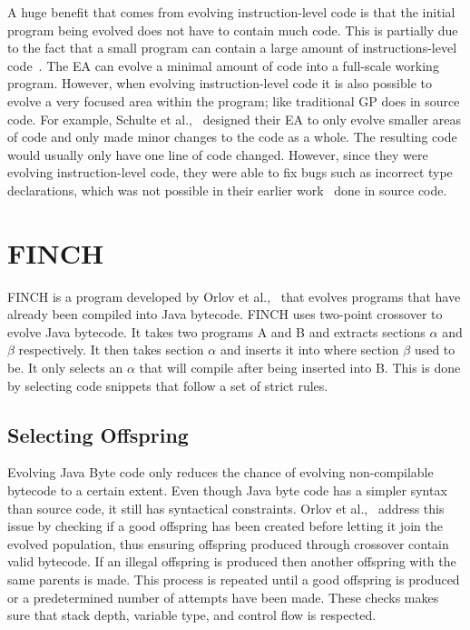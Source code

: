 \documentclass{sig-alternate}
\begin{document}
A huge benefit that comes from evolving instruction-level code is that the initial program being evolved does not have to contain much code. This is partially due to the fact that a small program can contain a large amount of instructions-level code~\cite{Assembly:2010}. The EA can evolve a minimal amount of code into a full-scale working program. However, when evolving instruction-level code it is also possible to evolve a very focused area within the program; like traditional GP does in source code. For example, Schulte et al.,~\cite{Assembly:2010} designed their EA to only evolve smaller areas of code and only made minor changes to the code as a whole. The resulting code would usually only have one line of code changed. However, since they were evolving instruction-level code, they were able to fix bugs such as incorrect type declarations, which was not possible in their earlier work~\cite{Forrest:2009} done in source code. 

\section{FINCH}
FINCH is a program developed by Orlov et al.,~\cite{FINCH2:2009,FINCH:2011} that evolves programs that have already been compiled into Java bytecode. FINCH uses two-point crossover to evolve Java bytecode. It takes two programs A and B and extracts sections $\alpha$ and $\beta$ respectively. It then takes section $\alpha$ and inserts it into where section $\beta$ used to be. It only selects an $\alpha$ that will compile after being inserted into B. This is done by selecting code snippets that follow a set of strict rules. 

\subsection{Selecting Offspring}
Evolving Java Byte code only reduces the chance of evolving non-compilable bytecode to a certain extent. Even though Java byte code has a simpler syntax than source code, it still has syntactical constraints. Orlov et al.,~\cite{FINCH2:2009} address this issue by checking if a good offspring has been created before letting it join the evolved population, thus ensuring offspring produced through crossover contain valid bytecode. If an illegal offspring is produced then another offspring with the same parents is made. This process is repeated until a good offspring is produced or a predetermined number of attempts have been made. These checks makes sure that stack depth, variable type, and control flow is respected.\par
\end{document}
